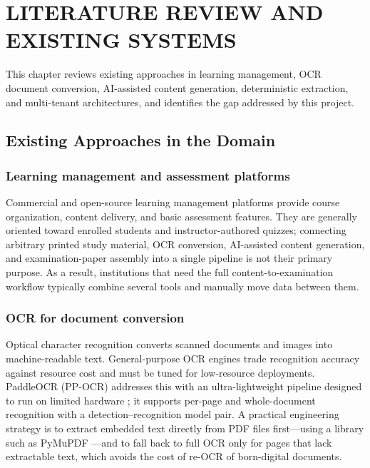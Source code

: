 \chapter{LITERATURE REVIEW AND EXISTING SYSTEMS}
\thispagestyle{empty}

This chapter reviews existing approaches in learning management, OCR
document conversion, AI-assisted content generation, deterministic
extraction, and multi-tenant architectures, and identifies the gap addressed
by this project.

\clearpage

\section{Existing Approaches in the Domain}

\subsection{Learning management and assessment platforms}

Commercial and open-source learning management platforms provide course
organization, content delivery, and basic assessment features. They are
generally oriented toward enrolled students and instructor-authored quizzes;
connecting arbitrary printed study material, OCR conversion, AI-assisted
content generation, and examination-paper assembly into a single pipeline is
not their primary purpose. As a result, institutions that need the full
content-to-examination workflow typically combine several tools and
manually move data between them.

\subsection{OCR for document conversion}

Optical character recognition converts scanned documents and images into
machine-readable text. General-purpose OCR engines trade recognition accuracy
against resource cost and must be tuned for low-resource deployments.
PaddleOCR (PP-OCR) addresses this with an ultra-lightweight pipeline designed
to run on limited hardware \cite{ppocr,ppocrv3}; it supports per-page and
whole-document recognition with a detection--recognition model pair. A
practical engineering strategy is to extract embedded text directly from
PDF files first---using a library such as PyMuPDF \cite{pymupdf}---and to
fall back to full OCR only for pages that lack extractable text, which
avoids the cost of re-OCR of born-digital documents.

